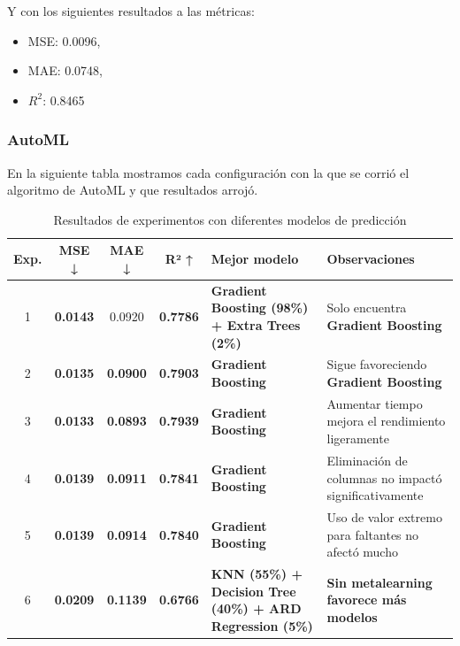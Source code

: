 \documentclass{article}
\begin{document}
Y con los siguientes resultados a las métricas:
\begin{itemize}
    \item MSE: 0.0096,
    \item MAE: 0.0748,
    \item \(R^2\): 0.8465
\end{itemize}

\newpage

\subsubsection{AutoML}
En la siguiente tabla mostramos cada configuración con la que se corrió el algoritmo de AutoML y que resultados arrojó.


\begin{table}[h]
    \centering
    \small %
    \renewcommand{\arraystretch}{1.2} %
    \begin{tabularx}{\textwidth}{|c|c|c|c|X|X|}
        \hline
        \textbf{Exp.} & \textbf{MSE ↓}  & \textbf{MAE ↓}  & \textbf{R² ↑}   & \textbf{Mejor modelo}                                             & \textbf{Observaciones}                                \\
        \hline
        1             & \textbf{0.0143} & 0.0920          & \textbf{0.7786} & \textbf{Gradient Boosting (98\%) + Extra Trees (2\%)}             & Solo encuentra \textbf{Gradient Boosting}             \\
        \hline
        2             & \textbf{0.0135} & \textbf{0.0900} & \textbf{0.7903} & \textbf{Gradient Boosting}                                        & Sigue favoreciendo \textbf{Gradient Boosting}         \\
        \hline
        3             & \textbf{0.0133} & \textbf{0.0893} & \textbf{0.7939} & \textbf{Gradient Boosting}                                        & Aumentar tiempo mejora el rendimiento ligeramente     \\
        \hline
        4             & \textbf{0.0139} & \textbf{0.0911} & \textbf{0.7841} & \textbf{Gradient Boosting}                                        & Eliminación de columnas no impactó significativamente \\
        \hline
        5             & \textbf{0.0139} & \textbf{0.0914} & \textbf{0.7840} & \textbf{Gradient Boosting}                                        & Uso de valor extremo para faltantes no afectó mucho   \\
        \hline
        6             & \textbf{0.0209} & \textbf{0.1139} & \textbf{0.6766} & \textbf{KNN (55\%) + Decision Tree (40\%) + ARD Regression (5\%)} & \textbf{Sin metalearning favorece más modelos}        \\
        \hline
    \end{tabularx}
    \caption{Resultados de experimentos con diferentes modelos de predicción}
    \label{tab:resultados_experimentos}
\end{table}
\end{document}
